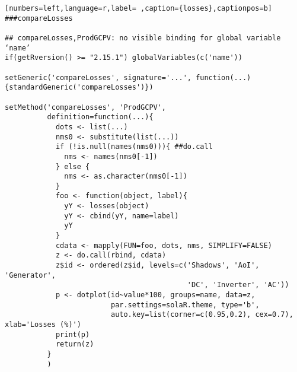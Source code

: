 \begin{lstlisting}[numbers=left,language=r,label= ,caption={losses},captionpos=b]
###compareLosses

## compareLosses,ProdGCPV: no visible binding for global variable ‘name’
if(getRversion() >= "2.15.1") globalVariables(c('name'))

setGeneric('compareLosses', signature='...', function(...){standardGeneric('compareLosses')})

setMethod('compareLosses', 'ProdGCPV',
          definition=function(...){
            dots <- list(...)
            nms0 <- substitute(list(...))
            if (!is.null(names(nms0))){ ##do.call
              nms <- names(nms0[-1])
            } else {
              nms <- as.character(nms0[-1])
            }
            foo <- function(object, label){
              yY <- losses(object)
              yY <- cbind(yY, name=label)
              yY
            }
            cdata <- mapply(FUN=foo, dots, nms, SIMPLIFY=FALSE)
            z <- do.call(rbind, cdata)
            z$id <- ordered(z$id, levels=c('Shadows', 'AoI', 'Generator',
                                           'DC', 'Inverter', 'AC'))
            p <- dotplot(id~value*100, groups=name, data=z,
                         par.settings=solaR.theme, type='b',
                         auto.key=list(corner=c(0.95,0.2), cex=0.7), xlab='Losses (%)')
            print(p)
            return(z)
          }
          )
\end{lstlisting}
